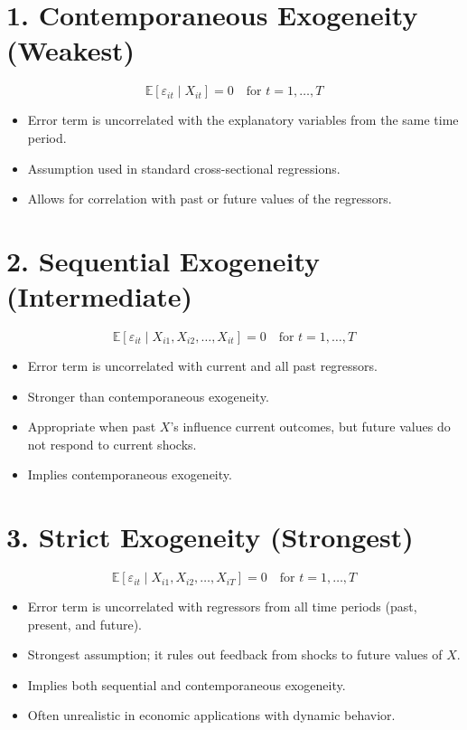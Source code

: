 \documentclass[12pt, oneside]{article}
\begin{document}
\section*{1. Contemporaneous Exogeneity (Weakest)}

\[
\mathbb{E}[\varepsilon_{it} \mid X_{it}] = 0 \quad \text{for } t = 1, \dots, T
\]

\begin{itemize}
  \item Error term is uncorrelated with the explanatory variables from the same time period.
  \item Assumption used in standard cross-sectional regressions.
  \item Allows for correlation with past or future values of the regressors.
\end{itemize}

\section*{2. Sequential Exogeneity (Intermediate)}

\[
\mathbb{E}[\varepsilon_{it} \mid X_{i1}, X_{i2}, \dots, X_{it}] = 0 \quad \text{for } t = 1, \dots, T
\]

\begin{itemize}
  \item Error term is uncorrelated with current and all past regressors.
  \item Stronger than contemporaneous exogeneity.
  \item Appropriate when past \( X \)'s influence current outcomes, but future values do not respond to current shocks.
  \item Implies contemporaneous exogeneity.
\end{itemize}

\section*{3. Strict Exogeneity (Strongest)}

\[
\mathbb{E}[\varepsilon_{it} \mid X_{i1}, X_{i2}, \dots, X_{iT}] = 0 \quad \text{for } t = 1, \dots, T
\]

\begin{itemize}
  \item Error term is uncorrelated with regressors from all time periods (past, present, and future).
  \item Strongest assumption; it rules out feedback from shocks to future values of \( X \).
  \item Implies both sequential and contemporaneous exogeneity.
  \item Often unrealistic in economic applications with dynamic behavior.
\end{itemize}
\end{document}
